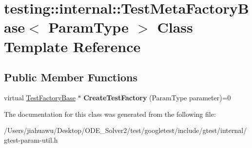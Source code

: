 \hypertarget{classtesting_1_1internal_1_1_test_meta_factory_base}{}\section{testing\+:\+:internal\+:\+:Test\+Meta\+Factory\+Base$<$ Param\+Type $>$ Class Template Reference}
\label{classtesting_1_1internal_1_1_test_meta_factory_base}
\subsection*{Public Member Functions}
\begin{DoxyCompactItemize}
\item 
\mbox{\label{classtesting_1_1internal_1_1_test_meta_factory_base_a853daab362740bcac55e180128d564ef}} 
virtual \mbox{\hyperlink{classtesting_1_1internal_1_1_test_factory_base}{Test\+Factory\+Base}} $\ast$ {\bfseries Create\+Test\+Factory} (Param\+Type parameter)=0
\end{DoxyCompactItemize}


The documentation for this class was generated from the following file\+:\begin{DoxyCompactItemize}
\item 
/\+Users/jiahuawu/\+Desktop/\+O\+D\+E\+\_\+\+Solver2/test/googletest/include/gtest/internal/gtest-\/param-\/util.\+h\end{DoxyCompactItemize}
